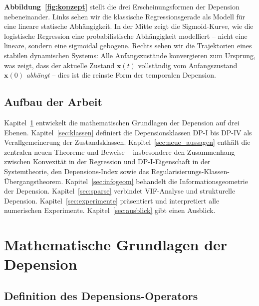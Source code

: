 ﻿\documentclass[12pt, a4paper]{article}
\theoremstyle{definition}
\theoremstyle{remark}
\newcommand{\vx}{\bm{x}}
\begin{document}
\textbf{Abbildung~\ref{fig:konzept}} stellt die drei Erscheinungsformen der Depension
nebeneinander. Links sehen wir die klassische Regressionsgerade als Modell für eine
lineare statische Abhängigkeit. In der Mitte zeigt die Sigmoid-Kurve, wie die logistische
Regression eine probabilistische Abhängigkeit modelliert -- nicht eine lineare, sondern
eine sigmoidal gebogene. Rechts sehen wir die Trajektorien eines stabilen dynamischen
Systems: Alle Anfangszustände konvergieren zum Ursprung, was zeigt, dass der aktuelle
Zustand $\vx(t)$ vollständig vom Anfangszustand $\vx(0)$ \emph{abhängt} -- dies ist
die reinste Form der temporalen Depension.

\subsection{Aufbau der Arbeit}

Kapitel~\ref{sec:grundlagen} entwickelt die mathematischen Grundlagen der Depension
auf drei Ebenen. Kapitel~\ref{sec:klassen} definiert die Depensionsklassen DP-I bis
DP-IV als Verallgemeinerung der Zustandsklassen. Kapitel~\ref{sec:neue_aussagen}
enthält die zentralen neuen Theoreme und Beweise -- insbesondere den Zusammenhang
zwischen Konvexität in der Regression und DP-I-Eigenschaft in der Systemtheorie,
den Depensions-Index sowie das Regularisierungs-Klassen-Übergangstheorem.
Kapitel~\ref{sec:infogeom} behandelt die Informationsgeometrie der Depension.
Kapitel~\ref{sec:sparse} verbindet VIF-Analyse und strukturelle Depension.
Kapitel~\ref{sec:experimente} präsentiert und interpretiert alle numerischen
Experimente. Kapitel~\ref{sec:ausblick} gibt einen Ausblick.

\section{Mathematische Grundlagen der Depension}
\label{sec:grundlagen}

\subsection{Definition des Depensions-Operators}
\end{document}
